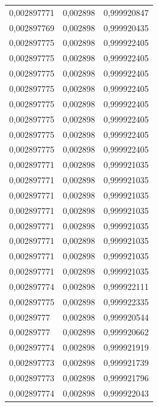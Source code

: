 \begin{center}
\begin{longtable}{|l|l|l|}
0,002897771        & 0,002898              & 0,999920847  \\
0,002897769        & 0,002898              & 0,999920435  \\
0,002897775        & 0,002898              & 0,999922405  \\
0,002897775        & 0,002898              & 0,999922405  \\
0,002897775        & 0,002898              & 0,999922405  \\
0,002897775        & 0,002898              & 0,999922405  \\
0,002897775        & 0,002898              & 0,999922405  \\
0,002897775        & 0,002898              & 0,999922405  \\
0,002897775        & 0,002898              & 0,999922405  \\
0,002897775        & 0,002898              & 0,999922405  \\
0,002897771        & 0,002898              & 0,999921035  \\
0,002897771        & 0,002898              & 0,999921035  \\
0,002897771        & 0,002898              & 0,999921035  \\
0,002897771        & 0,002898              & 0,999921035  \\
0,002897771        & 0,002898              & 0,999921035  \\
0,002897771        & 0,002898              & 0,999921035  \\
0,002897771        & 0,002898              & 0,999921035  \\
0,002897771        & 0,002898              & 0,999921035  \\
0,002897774        & 0,002898              & 0,999922111  \\
0,002897775        & 0,002898              & 0,999922335  \\
0,00289777         & 0,002898              & 0,999920544  \\
0,00289777         & 0,002898              & 0,999920662  \\
0,002897774        & 0,002898              & 0,999921919  \\
0,002897773        & 0,002898              & 0,999921739  \\
0,002897773        & 0,002898              & 0,999921796  \\
0,002897774        & 0,002898              & 0,999922043  \\

\end{longtable}
\end{center}
